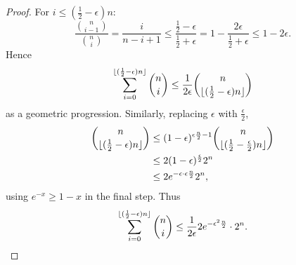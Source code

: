 \documentclass{article}
\DeclarePairedDelimiter\floor{\lfloor}{\rfloor}
\begin{document}
\begin{proof}
  For $i \leq (\frac{1}{2} - \epsilon) n:$
  \begin{equation*}
    \frac{\binom{n}{i-1}}{\binom{n}{i}} = \frac{i}{n-i+1} \leq \frac{\frac{1}{2} - \epsilon}{\frac{1}{2} + \epsilon} = 1 - \frac{2\epsilon}{\frac{1}{2} + \epsilon} \leq 1 - 2\epsilon.
  \end{equation*}
  Hence
  \begin{equation*}
    \sum_{i=0}^{\floor{(\frac{1}{2}-\epsilon) n}} \binom{n}{i} \leq \frac{1}{2\epsilon} \binom{n}{\floor{(\frac{1}{2} - \epsilon) n}}
  \end{equation*}
  as a geometric progression.
  Similarly, replacing $\epsilon$ with $\frac \epsilon 2$,
  \begin{align*}
    \binom{n}{\floor{(\frac{1}{2} - \epsilon)n}} &\leq (1-\epsilon)^{\epsilon \frac{n}{2} - 1} \binom{n}{\floor{(\frac{1}{2} - \frac{\epsilon}{2}) n}} \\
                                                 &\leq 2(1-\epsilon)^{\frac \epsilon 2} 2^n \\
                                                 &\leq 2 e^{-\epsilon \cdot \epsilon \frac n2} 2^n,
  \end{align*}
  using $e^{-x} \geq 1-x$ in the final step.
  Thus
  \begin{equation*}
    \sum_{i=0}^{\floor{(\frac{1}{2} - \epsilon) n}} \binom{n}{i}\leq \frac{1}{2\epsilon} 2 e^{-\epsilon^2 \frac{n}{2}} \cdot 2^n. \qedhere
  \end{equation*}
\end{proof}
\end{document}
